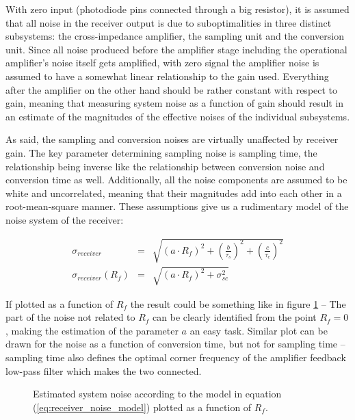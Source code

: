 With zero input (photodiode pins connected through a big resistor), it is assumed that all noise in the receiver output is due to suboptimalities in three distinct subsystems: the cross-impedance amplifier, the sampling unit and the conversion unit. Since all noise produced before the amplifier stage including the operational amplifier's noise itself gets amplified, with zero signal the amplifier noise is assumed to have a somewhat linear relationship to the gain used. Everything after the amplifier on the other hand should be rather constant with respect to gain, meaning that measuring system noise as a function of gain should result in an estimate of the magnitudes of the effective noises of the individual subsystems.

As said, the sampling and conversion noises are virtually unaffected by receiver gain. The key parameter determining sampling noise is sampling time, the relationship being inverse like the relationship between conversion noise and conversion time as well. Additionally, all the noise components are assumed to be white and uncorrelated, meaning that their magnitudes add into each other in a root-mean-square manner. These assumptions give us a rudimentary model of the noise system of the receiver:

\begin{equation}
  \begin{array}{ccl}
	\sigma_{receiver} &=& \sqrt{ (a \cdot R_f)^2 + (\frac{b}{\tau_s})^2 + (\frac{c}{\tau_c})^2} \\
	\sigma_{receiver}(R_f) &=& \sqrt{ (a \cdot R_f)^2 + \sigma_{sc}^2} 
	\end{array}
	\label{eq:receiver_noise_model}
\end{equation}

If plotted as a function of $R_f$ the result could be something like in figure \ref{fig:receiver_noise_model} -- The part of the noise not related to $R_f$ can be clearly identified from the point $R_f = 0$, making the estimation of the parameter $a$ an easy task. Similar plot can be drawn for the noise as a function of conversion time, but not for sampling time -- sampling time also defines the optimal corner frequency of the amplifier feedback low-pass filter which makes the two connected.

\begin{figure}[htcb]
\caption{Estimated system noise according to the model in equation (\ref{eq:receiver_noise_model}) plotted as a function of $R_f$.}
\label{fig:receiver_noise_model}
\end{figure}

